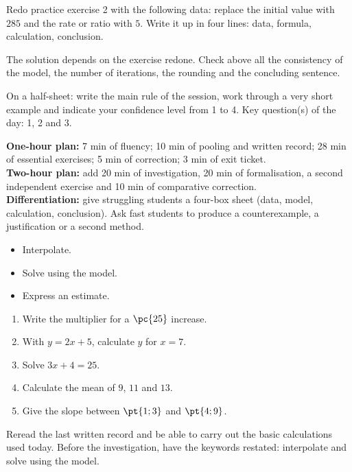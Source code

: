 
\begin{homework}Redo practice exercise 2 with the following data: replace the initial value with $285$ and the rate or ratio with $5$. Write it up in four lines: data, formula, calculation, conclusion.\end{homework}
\begin{solution}The solution depends on the exercise redone. Check above all the consistency of the model, the number of iterations, the rounding and the concluding sentence.\end{solution}

\begin{exitticket}[3 minutes]On a half-sheet: write the main rule of the session, work through a very short example and indicate your confidence level from 1 to 4. Key question(s) of the day: 1, 2 and 3.\end{exitticket}

\ifmxteacher
\begin{method}
\textbf{One-hour plan:} 7 min of fluency; 10 min of pooling and written record; 28 min of essential exercises; 5 min of correction; 3 min of exit ticket.\\
\textbf{Two-hour plan:} add 20 min of investigation, 20 min of formalisation, a second independent exercise and 10 min of comparative correction.\\
\textbf{Differentiation:} give struggling students a four-box sheet (data, model, calculation, conclusion). Ask fast students to produce a counterexample, a justification or a second method.
\end{method}
\fi
{}
\begin{objectives}\begin{itemize}\item Interpolate.\item Solve using the model.\item Express an estimate.\end{itemize}\end{objectives}
\begin{fluency}\begin{enumerate}\item Write the multiplier for a $\pc{25}$ increase. \item With $y=2x+5$, calculate $y$ for $x=7$. \item Solve $3x+4=25$. \item Calculate the mean of $9$, $11$ and $13$. \item Give the slope between $\pt{1;3}$ and $\pt{4;9}$. \end{enumerate}\end{fluency}
\begin{prerequisites}Reread the last written record and be able to carry out the basic calculations used today. Before the investigation, have the keywords restated: interpolate and solve using the model.\end{prerequisites}

